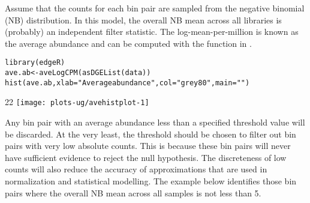 \documentclass{report}\usepackage[]{graphicx}\usepackage[usenames,dvipsnames]{color}
\makeatletter
\def\maxwidth{ %
  \ifdim\Gin@nat@width>\linewidth
    \linewidth
  \else
    \Gin@nat@width
  \fi
}
\newcommand{\hlnum}[1]{\textcolor[rgb]{0.816,0.125,0.439}{#1}}%
\newcommand{\hlstr}[1]{\textcolor[rgb]{0.251,0.627,0.251}{#1}}%
\newcommand{\hlopt}[1]{\textcolor[rgb]{0,0,0}{#1}}%
\newcommand{\hlstd}[1]{\textcolor[rgb]{0.251,0.251,0.251}{#1}}%
\newcommand{\hlkwb}[1]{\textcolor[rgb]{0,0,0}{#1}}%
\newcommand{\hlkwc}[1]{\textcolor[rgb]{0.251,0.251,0.251}{#1}}%
\newcommand{\hlkwd}[1]{\textcolor[rgb]{0.878,0.439,0.125}{#1}}%
\newenvironment{knitrout}{}{} %
\makeatother
\begin{document}
Assume that the counts for each bin pair are sampled from the negative binomial (NB) distribution.
In this model, the overall NB mean across all libraries is (probably) an independent filter statistic.
The log-mean-per-million is known as the average abundance and can be computed with the  function in  \cite{mccarthy2012glm}.

\begin{knitrout}
\color{fgcolor}\begin{kframe}
\begin{alltt}
\hlkwd{library}\hlstd{(edgeR)}
\hlstd{ave.ab} \hlkwb{<-} \hlkwd{aveLogCPM}\hlstd{(}\hlkwd{asDGEList}\hlstd{(data))}
\hlkwd{hist}\hlstd{(ave.ab,} \hlkwc{xlab}\hlstd{=}\hlstr{"Average abundance"}\hlstd{,} \hlkwc{col}\hlstd{=}\hlstr{"grey80"}\hlstd{,} \hlkwc{main}\hlstd{=}\hlstr{""}\hlstd{)}
\end{alltt}
\end{kframe}\begin{adjustwidth}{2\fltoffset}{2\fltoffset}
\texttt{[image: plots-ug/avehistplot-1]} \end{adjustwidth}
\end{knitrout}

Any bin pair with an average abundance less than a specified threshold value will be discarded.
At the very least, the threshold should be chosen to filter out bin pairs with very low absolute counts.
This is because these bin pairs will never have sufficient evidence to reject the null hypothesis.
The discreteness of low counts will also reduce the accuracy of approximations that are used in normalization and statistical modelling.
The example below identifies those bin pairs where the overall NB mean across all samples is not less than 5.

\begin{knitrout}
\color{fgcolor}
\end{knitrout}
\end{document}
